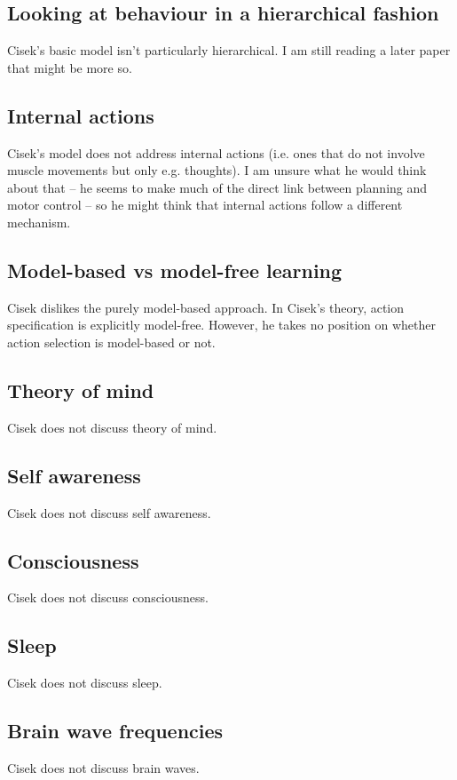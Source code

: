 \documentclass[10pt,a4paper]{article}
\begin{document}
\subsection{Looking at behaviour in a hierarchical fashion}
Cisek's basic model isn't particularly hierarchical. I am still reading a later paper that might be more so.

\subsection{Internal actions}
Cisek's model does not address internal actions (i.e. ones that do not involve muscle movements but only e.g. thoughts). I am unsure what he would think about that -- he seems to make much of the direct link between planning and motor control -- so he might think that internal actions follow a different mechanism.

\subsection{Model-based vs model-free learning}
Cisek dislikes the purely model-based approach. In Cisek's theory, action specification is explicitly model-free. However, he takes no position on whether action selection is model-based or not.

\subsection{Theory of mind}
Cisek does not discuss theory of mind.

\subsection{Self awareness}
Cisek does not discuss self awareness.

\subsection{Consciousness}
Cisek does not discuss consciousness.

\subsection{Sleep}
Cisek does not discuss sleep.

\subsection{Brain wave frequencies}
Cisek does not discuss brain waves.
\end{document}
